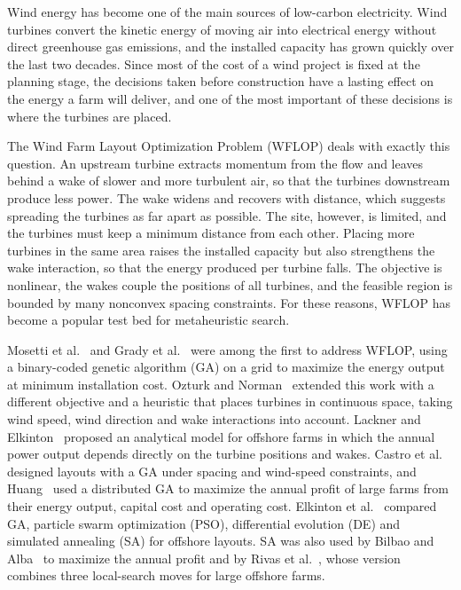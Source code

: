\documentclass[journal,twoside]{IEEEtran}
\begin{document}
Wind energy has become one of the main sources of low-carbon electricity. Wind turbines convert the kinetic energy of moving air into electrical energy without direct greenhouse gas emissions, and the installed capacity has grown quickly over the last two decades. Since most of the cost of a wind project is fixed at the planning stage, the decisions taken before construction have a lasting effect on the energy a farm will deliver, and one of the most important of these decisions is where the turbines are placed.

The Wind Farm Layout Optimization Problem (WFLOP) deals with exactly this question. An upstream turbine extracts momentum from the flow and leaves behind a wake of slower and more turbulent air, so that the turbines downstream produce less power. The wake widens and recovers with distance, which suggests spreading the turbines as far apart as possible. The site, however, is limited, and the turbines must keep a minimum distance from each other. Placing more turbines in the same area raises the installed capacity but also strengthens the wake interaction, so that the energy produced per turbine falls. The objective is nonlinear, the wakes couple the positions of all turbines, and the feasible region is bounded by many nonconvex spacing constraints. For these reasons, WFLOP has become a popular test bed for metaheuristic search.

Mosetti et al.~\cite{Mosetti1994} and Grady et al.~\cite{Grady2005} were among the first to address WFLOP, using a binary-coded genetic algorithm (GA) on a grid to maximize the energy output at minimum installation cost. Ozturk and Norman~\cite{Ozturk2004} extended this work with a different objective and a heuristic that places turbines in continuous space, taking wind speed, wind direction and wake interactions into account. Lackner and Elkinton~\cite{Lackner2007} proposed an analytical model for offshore farms in which the annual power output depends directly on the turbine positions and wakes. Castro et al.~\cite{Mora2007} designed layouts with a GA under spacing and wind-speed constraints, and Huang~\cite{Huang2007} used a distributed GA to maximize the annual profit of large farms from their energy output, capital cost and operating cost. Elkinton et al.~\cite{Elkinton2008} compared GA, particle swarm optimization (PSO), differential evolution (DE) and simulated annealing (SA) for offshore layouts. SA was also used by Bilbao and Alba~\cite{Bilbao2009} to maximize the annual profit and by Rivas et al.~\cite{Rivas2009}, whose version combines three local-search moves for large offshore farms.
\end{document}
